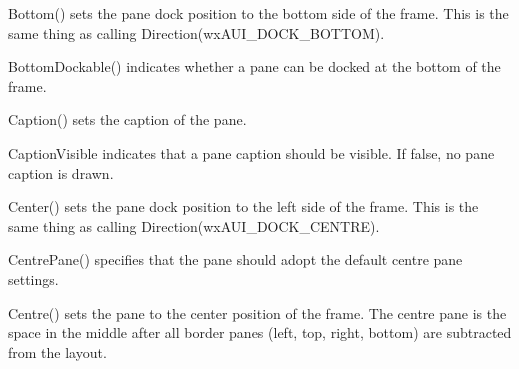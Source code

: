 \label{wxauipaneinfobottom}


Bottom() sets the pane dock position to the bottom side of the frame.  This is the same thing as calling Direction(wxAUI_DOCK_BOTTOM).

\label{wxauipaneinfobottomdockable}


BottomDockable() indicates whether a pane can be docked at the bottom of the frame.

\label{wxauipaneinfocaption}


Caption() sets the caption of the pane.

\label{wxauipaneinfocaptionvisible}


CaptionVisible indicates that a pane caption should be visible.  If false, no pane caption is drawn.

\label{wxauipaneinfocentre}


Center() sets the pane dock position to the left side of the frame.  This is the same thing as calling Direction(wxAUI_DOCK_CENTRE).

\label{wxauipaneinfocentrepane}


CentrePane() specifies that the pane should adopt the default centre pane settings.

\label{wxauipaneinfocentre}


Centre() sets the pane to the center position of the frame.  The centre pane is the space in the middle after all border panes (left, top, right, bottom) are subtracted from the layout.

\label{wxauipaneinfocentrepane}

